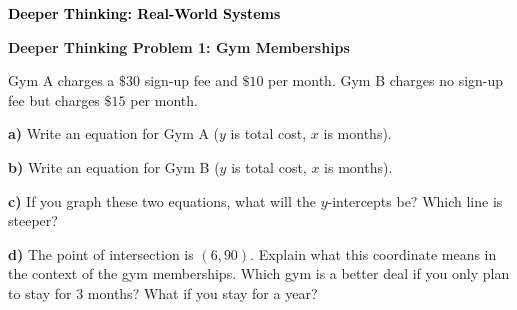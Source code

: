 \documentclass[12pt, letterpaper, fleqn]{article}
\begin{document}
\newpage

\begin{tcolorbox}[colback=customteal!20]
\large\textcolor{black}{\textbf{Deeper Thinking: Real-World Systems}}
\end{tcolorbox}

\vspace{3mm}

\begin{tcolorbox}[colback=white!15, colframe=black, boxrule=1.5pt, arc=4mm, left=6mm, right=6mm, top=5mm, bottom=5mm]

\textbf{Deeper Thinking Problem 1: Gym Memberships}

\medskip

\noindent
Gym A charges a $\$30$ sign-up fee and $\$10$ per month. 
Gym B charges no sign-up fee but charges $\$15$ per month.

\vspace{5mm}

\noindent
\textbf{a)} Write an equation for Gym A ($y$ is total cost, $x$ is months).

\vspace{1.5cm}

\noindent
\textbf{b)} Write an equation for Gym B ($y$ is total cost, $x$ is months).

\vspace{1.5cm}

\noindent
\textbf{c)} If you graph these two equations, what will the $y$-intercepts be? Which line is steeper?

\vspace{2cm}

\noindent
\textbf{d)} The point of intersection is $(6, 90)$. Explain what this coordinate means in the context of the gym memberships. Which gym is a better deal if you only plan to stay for 3 months? What if you stay for a year?

\vspace{3cm}

\end{tcolorbox}
\end{document}
